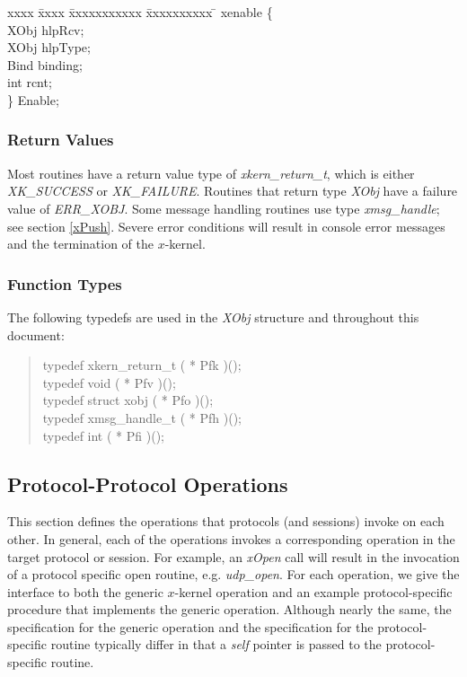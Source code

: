 \begin{tabbing}
xxxx \= xxxx \= xxxxxxxxxxx \= xxxxxxxxxx \=\kill
{} {\bold xenable}  \{\\
\>\>  {\sem XObj}         \>hlpRcv;\>\\
\>\>  {\sem XObj}         \>hlpType;\>\\
\>\>  {\sem Bind} 	\>binding;\>\\
\>\>  {\sem int} 	\>rcnt;\>\\
\>\} {\bold Enable};
\end{tabbing}

\subsubsection{Return Values}

Most routines have a return value type of {\em xkern\_return\_t},
which is either {\em XK\_SUCCESS} or {\em XK\_FAILURE}.  Routines that
return type {\em XObj} have a failure value of {\em ERR\_XOBJ}.  Some
message handling routines use type {\em xmsg\_handle}; see section
\ref{xPush}.  Severe error conditions will result in console error
messages and the termination of the $x$-kernel.

\subsubsection{Function Types}

The following typedefs are used in the {\em XObj} structure and
throughout this document:

\begin{quote}
{\sem typedef xkern\_return\_t } ( * Pfk )();\\
{\sem typedef void } ( * Pfv )();\\
{\sem typedef struct xobj } ( * Pfo )();\\
{\sem typedef xmsg\_handle\_t } ( * Pfh )();\\ 
{\sem typedef int } ( * Pfi )();
\end{quote}

\subsection{Protocol-Protocol Operations}

This section defines the operations that protocols (and sessions)
invoke on each other. In general, each of the operations invokes a
corresponding operation in the target protocol or session.  For
example, an {\em xOpen} call will result in the invocation of a
protocol specific open routine, e.g.  {\em udp\_open}.  For each
operation, we give the interface to both the generic $x$-kernel
operation and an example protocol-specific procedure that implements
the generic operation.  Although nearly the same, the specification
for the generic operation and the specification for the
protocol-specific routine typically differ in that a {\it self}
pointer is passed to the protocol-specific routine.

